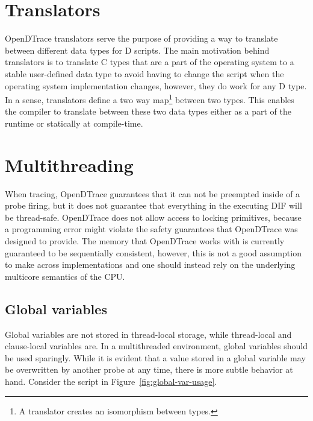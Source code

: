 \section{Translators}
\label{sec:translators}

OpenDTrace translators serve the purpose of providing a way to translate between
different data types for D scripts. The main motivation behind translators is to
translate C types that are a part of the operating system to a stable user-defined
data type to avoid having to change the script when the operating system implementation
changes, however, they do work for any D type. In a sense, translators define a two way
map\footnote{A translator creates an isomorphism between types.} between two types.
This enables the compiler to translate between these two data types either as a part of
the runtime or statically at compile-time.

\section{Multithreading}

%

When tracing, OpenDTrace guarantees that it can not be preempted
inside of a probe firing, but it does not guarantee that everything
in the executing DIF will be thread-safe. OpenDTrace does not allow
access to locking primitives, because a programming error might violate
the safety guarantees that OpenDTrace was designed to provide.
The memory that OpenDTrace works with is currently guaranteed to be
sequentially consistent, however, this is not a good assumption to make
across implementations and one should instead rely on the underlying
multicore semantics of the CPU.

\subsection{Global variables}

Global variables are not stored in thread-local storage, while
thread-local and clause-local variables are. In a multithreaded
environment, global variables should be used sparingly. While it is
evident that a value stored in a global variable may be overwritten by
another probe at any time, there is more subtle behavior at
hand. Consider the script in Figure~\ref{fig:global-var-usage}. \newline

